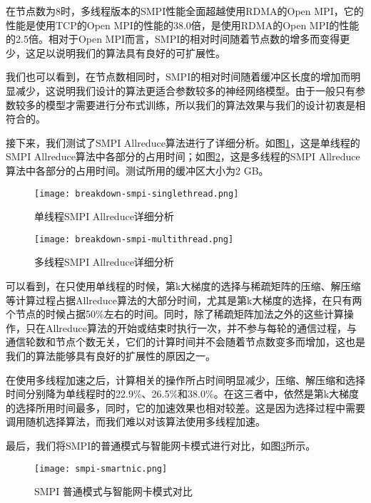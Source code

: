 在节点数为8时，多线程版本的SMPI性能全面超越使用RDMA的Open MPI，它的性能是使用TCP的Open MPI的性能的38.0倍，是使用RDMA的Open MPI的性能的2.5倍。相对于Open MPI而言，SMPI的相对时间随着节点数的增多而变得更少，这足以说明我们的算法具有良好的可扩展性。

我们也可以看到，在节点数相同时，SMPI的相对时间随着缓冲区长度的增加而明显减少，这说明我们设计的算法更适合参数较多的神经网络模型。由于一般只有参数较多的模型才需要进行分布式训练，所以我们的算法效果与我们的设计初衷是相符合的。

接下来，我们测试了SMPI Allreduce算法进行了详细分析。如图\ref{fig:breakdown-smpi-singlethread}，这是单线程的SMPI Allreduce算法中各部分的占用时间；如图\ref{fig:breakdown-smpi-multithread}，这是多线程的SMPI Allreduce算法中各部分的占用时间。测试所用的缓冲区大小为2 GB。

\begin{figure}[ht] %
    \centering
    \texttt{[image: breakdown-smpi-singlethread.png]}
    \caption{单线程SMPI Allreduce详细分析}
    \label{fig:breakdown-smpi-singlethread}
  \end{figure}

  \begin{figure}[ht] %
    \centering
    \texttt{[image: breakdown-smpi-multithread.png]}
    \caption{多线程SMPI Allreduce详细分析}
    \label{fig:breakdown-smpi-multithread}
  \end{figure}

可以看到，在只使用单线程的时候，第k大梯度的选择与稀疏矩阵的压缩、解压缩等计算过程占据Allreduce算法的大部分时间，尤其是第k大梯度的选择，在只有两个节点的时候占据50\%左右的时间。同时，除了稀疏矩阵加法之外的这些计算操作，只在Allreduce算法的开始或结束时执行一次，并不参与每轮的通信过程，与通信轮数和节点个数无关，它们的计算时间并不会随着节点数变多而增加，这也是我们的算法能够具有良好的扩展性的原因之一。

在使用多线程加速之后，计算相关的操作所占时间明显减少，压缩、解压缩和选择时间分别降为单线程时的22.9\%、26.5\%和38.0\%。在这三者中，依然是第k大梯度的选择所用时间最多，同时，它的加速效果也相对较差。这是因为选择过程中需要调用随机选择算法，而我们难以对该算法使用多线程加速。

最后，我们将SMPI的普通模式与智能网卡模式进行对比，如图\ref{fig:smpi-smartnic}所示。

\begin{figure}[ht] %
    \centering
    \texttt{[image: smpi-smartnic.png]}
    \caption{SMPI 普通模式与智能网卡模式对比}
    \label{fig:smpi-smartnic}
  \end{figure}

